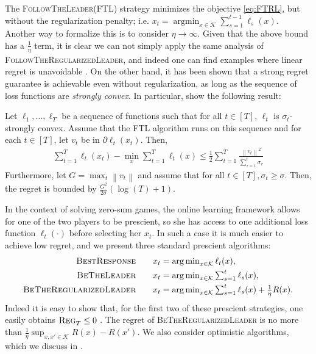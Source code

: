 \documentclass[final,12pt]{colt2018} %
\def\K{\mathcal{K}}
\def\argmin{\mathop{\arg\min}}
\def\BTL{\textsc{BeTheLeader}\xspace}
\def\FTL{\textsc{FollowTheLeader}\xspace}
\def\FTRL{\textsc{FollowTheRegularizedLeader}\xspace}
\def\BTRL{\textsc{BeTheRegularizedLeader}\xspace}
\def\BR{\textsc{BestResponse}\xspace}
\newcommand{\norm}[1]{\left\lVert#1\right\rVert}
\newcommand{\uregret}[1]{\textsc{Reg}^{#1}_T}
\begin{document}
The \FTL (FTL) strategy minimizes the objective \eqref{eq:FTRL}, but without the regularization penalty; i.e. $x_t = \argmin_{x \in \K} \sum_{s=1}^{t-1} \ell_s(x)$. Another way to formalize this is to consider $\eta \to \infty$. Given that the above bound has a $\frac 1 \eta$ term, it is clear we can not simply apply the same analysis of \FTRL, and indeed one can find examples where linear regret is unavoidable \cite{cesa2006prediction,shalev2012online}. On the other hand, it has been shown that a strong regret guarantee is achievable even without regularization, as long as the sequence of loss functions are \emph{strongly convex}. In particular, \cite{KS09} show the following result:
\begin{lemma}\label{lemma:ogd_strCvx}
Let $\ell_1, . . . ,\ell_T$ be a sequence of functions such that for all $t \in [T]$, $\ell_t$ is $\sigma_t$-strongly convex. Assume that the FTL algorithm runs on this sequence and for each $t \in [T]$, let $v_t$ be in $\partial \ell_t(x_t)$. Then,
\begin{align}
\textstyle \sum_{t=1}^T \ell_t(x_t) - \min_x \sum_{t=1}^T \ell_t(x) 
\le \frac{1}{2}\sum_{t=1}^T \frac{\norm{v_t}^2}{\sum_{\tau=1}^{t}\sigma_\tau}
\end{align}
Furthermore, let $G = \max_t \norm{v_t}$ and assume that for all $t \in [T], \sigma_t \ge \sigma$. Then, the regret is bounded by $\frac{G^2}{2\sigma}(\log(T) + 1)$.
\end{lemma}
In the context of solving zero-sum games, the online learning framework allows for one of the two players to be prescient, so she has access to one additional loss function $\ell_t(\cdot)$ before selecting her $x_t$. In such a case it is much easier to achieve low regret, and we present three standard prescient algorithms:
\begin{align}
  \BR\quad\quad & \textstyle x_t = \argmin_{x \in \K} \ell_t(x),\\
  \BTL\quad\quad & \textstyle x_t = \argmin_{x \in \K} \sum_{s=1}^{t} \ell_s(x), \\
  \BTRL\quad\quad & \textstyle x_t = \argmin_{x \in \K} \sum_{s=1}^{t} \ell_s(x) + \frac 1 \eta R(x) .
\end{align}
Indeed it is easy to show that, for the first two of these prescient strategies, one easily obtains $\uregret{} \leq 0$ \citep{kalai2005efficient}. The regret of \BTRL is no more than $\frac 1 \eta \sup_{x,x' \in \K} R(x) - R(x')$. We also consider optimistic algorithms, which we discuss in .
\end{document}
